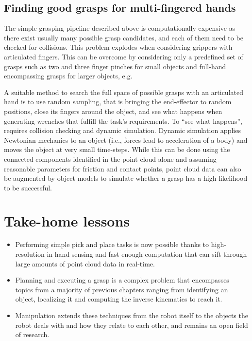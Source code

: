 \subsection{Finding good grasps for multi-fingered hands}

The simple grasping pipeline described above is computationally expensive as there exist usually many possible grasp candidates, and each of them need to be checked for collisions. This problem explodes when considering grippers with articulated fingers. This can be overcome by considering only a predefined set of grasps such as two and three finger pinches for small objects and full-hand encompassing grasps for larger objects, e.g.

A suitable method to search the full space of possible grasps with an articulated hand is to use random sampling, that is bringing the end-effector to random positions, close its fingers around the object, and see what happens when generating wrenches that fulfill the task's requirements.
To ``see what happens'', requires collision checking and dynamic simulation. Dynamic simulation applies Newtonian mechanics to an object (i.e., forces lead to acceleration of a body) and moves the object at very small time-steps. While this can be done using the connected components identified in the point cloud alone and assuming reasonable parameters for friction and contact points, point cloud data can also be augmented by object models to simulate whether a grasp has a high likelihood to be successful.




\section*{Take-home lessons}
\begin{itemize}
\item Performing simple pick and place tasks is now possible thanks to high-resolution in-hand sensing and fast enough computation that can sift through large amounts of point cloud data in real-time. 
\item Planning and executing a grasp is a complex problem that encompasses topics from a majority of previous chapters ranging from identifying an object, localizing it and computing the inverse kinematics to reach it.
\item Manipulation extends these techniques from the robot itself to the objects the robot deals with and how they relate to each other, and remains an open field of research. 
\end{itemize}

